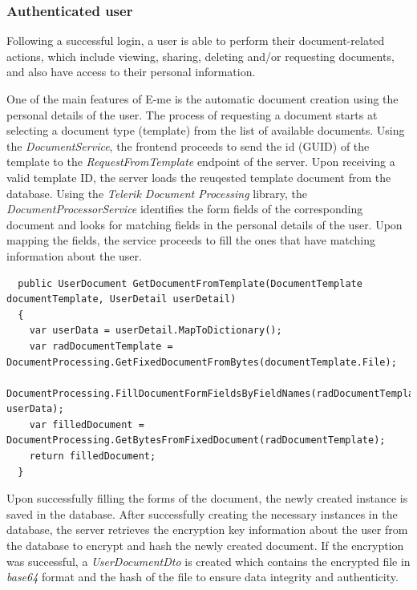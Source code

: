 \subsubsection{Authenticated user}

Following a successful login, a user is able to perform their document-related actions, which include viewing, sharing, deleting and/or requesting documents, 
and also have access to their personal information.

One of the main features of E-me is the automatic document creation using the personal details of the user.
The process of requesting a document starts at selecting a document type (template) from the list of available documents.
Using the \emph{DocumentService}, the frontend proceeds to send the id (GUID) of the template to the \emph{RequestFromTemplate} endpoint of the server.
Upon receiving a valid template ID, the server loads the reuqested template document from the database.
Using the \emph{Telerik Document Processing} library, the \emph{DocumentProcessorService} identifies the form fields of the corresponding document
and looks for matching fields in the personal details of the user.
Upon mapping the fields, the service proceeds to fill the ones that have matching information about the user.\pagebreak

\begin{lstlisting}
  public UserDocument GetDocumentFromTemplate(DocumentTemplate documentTemplate, UserDetail userDetail)
  {
	var userData = userDetail.MapToDictionary();
	var radDocumentTemplate = DocumentProcessing.GetFixedDocumentFromBytes(documentTemplate.File);
	DocumentProcessing.FillDocumentFormFieldsByFieldNames(radDocumentTemplate, userData);
	var filledDocument = DocumentProcessing.GetBytesFromFixedDocument(radDocumentTemplate);
	return filledDocument;
  }
\end{lstlisting}

Upon successfully filling the forms of the document, the newly created instance is saved in the database.
After successfully creating the necessary instances in the database, the server retrieves the encryption key information about the user from the database
to encrypt and hash the newly created document.
If the encryption was successful, a \emph{UserDocumentDto} is created which contains the encrypted file in \emph{base64} format and the hash of the file to
ensure data integrity and authenticity.

